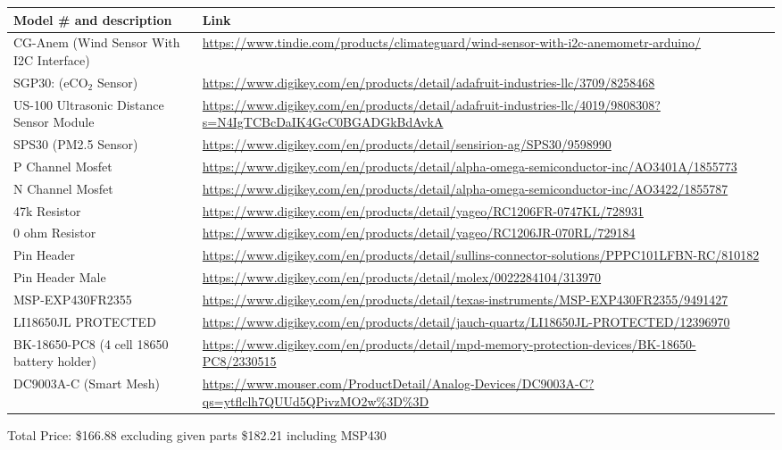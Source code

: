 \begin{table}[htbp]
  \centering
  \small
  \renewcommand{\arraystretch}{1.2}
  \begin{adjustbox}{max width=\textwidth}
    \begin{tabular}{|l|l|}
        \hline
        Model \# and description & Link \\ \hline
        CG-Anem (Wind Sensor With I2C Interface)          & \url{https://www.tindie.com/products/climateguard/wind-sensor-with-i2c-anemometr-arduino/} \\ \hline
        SGP30: (eCO$_2$ Sensor)                           & \url{https://www.digikey.com/en/products/detail/adafruit-industries-llc/3709/8258468} \\ \hline
        US-100 Ultrasonic Distance Sensor Module          & \url{https://www.digikey.com/en/products/detail/adafruit-industries-llc/4019/9808308?s=N4IgTCBcDaIK4GcC0BGADGkBdAvkA} \\ \hline
        SPS30 (PM2.5 Sensor)                              & \url{https://www.digikey.com/en/products/detail/sensirion-ag/SPS30/9598990} \\ \hline
        P Channel Mosfet                                  & \url{https://www.digikey.com/en/products/detail/alpha-omega-semiconductor-inc/AO3401A/1855773} \\ \hline
        N Channel Mosfet                                  & \url{https://www.digikey.com/en/products/detail/alpha-omega-semiconductor-inc/AO3422/1855787} \\ \hline
        47k Resistor                                      & \url{https://www.digikey.com/en/products/detail/yageo/RC1206FR-0747KL/728931} \\ \hline
        0 ohm Resistor                                    & \url{https://www.digikey.com/en/products/detail/yageo/RC1206JR-070RL/729184} \\ \hline
        Pin Header                                        & \url{https://www.digikey.com/en/products/detail/sullins-connector-solutions/PPPC101LFBN-RC/810182} \\ \hline
        Pin Header Male                                   & \url{https://www.digikey.com/en/products/detail/molex/0022284104/313970} \\ \hline
        MSP-EXP430FR2355                                  & \url{https://www.digikey.com/en/products/detail/texas-instruments/MSP-EXP430FR2355/9491427} \\ \hline
        LI18650JL PROTECTED                               & \url{https://www.digikey.com/en/products/detail/jauch-quartz/LI18650JL-PROTECTED/12396970} \\ \hline
        BK-18650-PC8 (4 cell 18650 battery holder)        & \url{https://www.digikey.com/en/products/detail/mpd-memory-protection-devices/BK-18650-PC8/2330515} \\ \hline
        DC9003A-C (Smart Mesh)                            & \url{https://www.mouser.com/ProductDetail/Analog-Devices/DC9003A-C?qs=ytflclh7QUUd5QPivzMO2w\%3D\%3D} \\ \hline
    \end{tabular}
  \end{adjustbox}
\end{table}
\label{tab:BOM}
Total Price: \$166.88 excluding given parts \$182.21 including MSP430 
